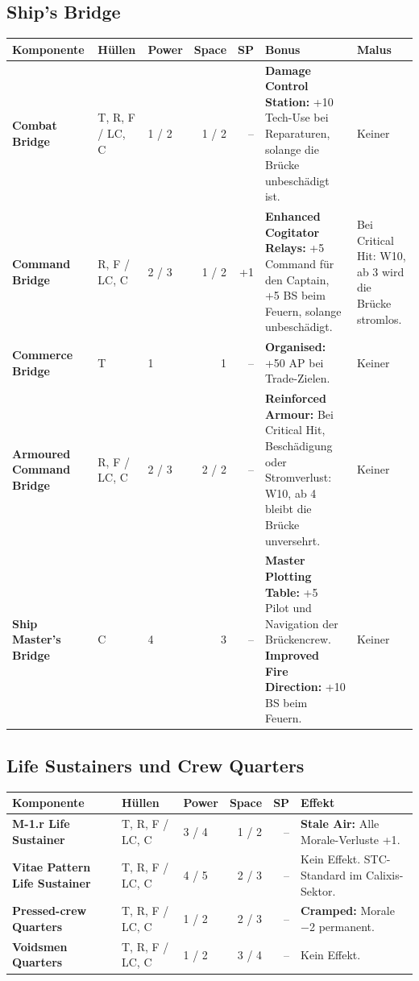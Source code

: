 \documentclass[9pt,a4paper]{extarticle}
\newcommand{\plus}[1]{\textcolor{good}{#1}}
\newcommand{\minus}[1]{\textcolor{bad}{#1}}
\newcommand{\nm}[1]{\textbf{#1}}
\newcommand{\eff}[1]{\textbf{#1:}}
\begin{document}
\subsection{Ship's Bridge}
\begin{xltabular}{\linewidth}{l H P N N Y Y}
\toprule
{}\textbf{Komponente} & \textbf{Hüllen} & \textbf{Power} & \textbf{Space} & \textbf{SP} & \textbf{Bonus} & \textbf{Malus}\\
\midrule
\endhead
\nm{Combat Bridge} & T, R, F / LC, C & 1 / 2 & 1 / 2 & – & \eff{Damage Control Station} \plus{+10 Tech-Use} bei Reparaturen, solange die Brücke unbeschädigt ist. & Keiner\\
\nm{Command Bridge} & R, F / LC, C & 2 / 3 & 1 / 2 & +1 & \eff{Enhanced Cogitator Relays} \plus{+5 Command} für den Captain, \plus{+5 BS} beim Feuern, solange unbeschädigt. & Bei Critical Hit: W10, ab 3 wird die Brücke stromlos.\\
\nm{Commerce Bridge} & T & 1 & 1 & – & \eff{Organised} \plus{+50 AP} bei Trade-Zielen. & Keiner\\
\nm{Armoured Command Bridge} & R, F / LC, C & 2 / 3 & 2 / 2 & – & \eff{Reinforced Armour} Bei Critical Hit, Beschädigung oder Stromverlust: W10, ab 4 bleibt die Brücke unversehrt. & Keiner\\
\nm{Ship Master's Bridge} & C & 4 & 3 & – & \eff{Master Plotting Table} \plus{+5 Pilot und Navigation} der Brückencrew. \eff{Improved Fire Direction} \plus{+10 BS} beim Feuern. & Keiner\\
\bottomrule
\end{xltabular}

\subsection{Life Sustainers und Crew Quarters}
\begin{xltabular}{\linewidth}{l H P N N Y}
\toprule
{}\textbf{Komponente} & \textbf{Hüllen} & \textbf{Power} & \textbf{Space} & \textbf{SP} & \textbf{Effekt}\\
\midrule
\endhead
\nm{M-1.r Life Sustainer} & T, R, F / LC, C & 3 / 4 & 1 / 2 & – & \eff{Stale Air} \minus{Alle Morale-Verluste +1}.\\
\nm{Vitae Pattern Life Sustainer} & T, R, F / LC, C & 4 / 5 & 2 / 3 & – & Kein Effekt. STC-Standard im Calixis-Sektor.\\
\nm{Pressed-crew Quarters} & T, R, F / LC, C & 1 / 2 & 2 / 3 & – & \eff{Cramped} \minus{Morale −2} permanent.\\
\nm{Voidsmen Quarters} & T, R, F / LC, C & 1 / 2 & 3 / 4 & – & Kein Effekt.\\
\bottomrule
\end{xltabular}
\end{document}
